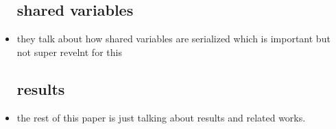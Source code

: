 \documentclass{article}
\begin{document}
\begin{itemize}
\subsection*{shared variables}
\item they talk about how shared variables are serialized which is important but not super revelnt for this 
\subsection*{results}
\item the rest of this paper is just talking about results and related works. 
\end{itemize}
\end{document}
